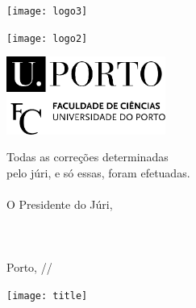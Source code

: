 \documentclass[11pt]{article}
\begin{document}
\raggedleft
\begin{minipage}[b][297mm][b]{54.3mm}

	\texttt{[image: logo3]}

	\vspace{3mm}
	\texttt{[image: logo2]}

	\vspace{3mm}
	\includegraphics[width=52mm]{fcup}

	{ \noindent\footnotesize Todas as correções determinadas \\
		pelo júri, e só essas, foram efetuadas. \\
		\\
		O Presidente do Júri, \\
		\\ 
		\\
		\\
		Porto, \underline{\qquad\quad}/\underline{\quad\qquad}/\underline{\qquad\qquad} \\
	}


	\texttt{[image: title]}
\end{minipage}

\newpage



\end{document}
